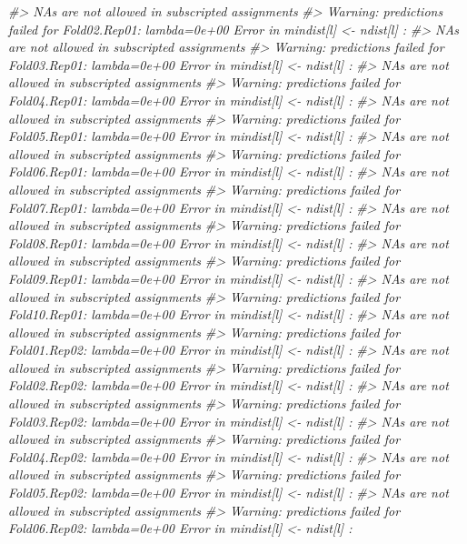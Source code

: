 \documentclass[]{book}
\newenvironment{Shaded}{\begin{snugshade}}{\end{snugshade}}
\newcommand{\CommentTok}[1]{\textcolor[rgb]{0.56,0.35,0.01}{\textit{#1}}}
\begin{document}
\begin{Shaded}
\begin{Highlighting}[]
\CommentTok{#>   NAs are not allowed in subscripted assignments}
\CommentTok{#> Warning: predictions failed for Fold02.Rep01: lambda=0e+00 Error in mindist[l] <- ndist[l] : }
\CommentTok{#>   NAs are not allowed in subscripted assignments}
\CommentTok{#> Warning: predictions failed for Fold03.Rep01: lambda=0e+00 Error in mindist[l] <- ndist[l] : }
\CommentTok{#>   NAs are not allowed in subscripted assignments}
\CommentTok{#> Warning: predictions failed for Fold04.Rep01: lambda=0e+00 Error in mindist[l] <- ndist[l] : }
\CommentTok{#>   NAs are not allowed in subscripted assignments}
\CommentTok{#> Warning: predictions failed for Fold05.Rep01: lambda=0e+00 Error in mindist[l] <- ndist[l] : }
\CommentTok{#>   NAs are not allowed in subscripted assignments}
\CommentTok{#> Warning: predictions failed for Fold06.Rep01: lambda=0e+00 Error in mindist[l] <- ndist[l] : }
\CommentTok{#>   NAs are not allowed in subscripted assignments}
\CommentTok{#> Warning: predictions failed for Fold07.Rep01: lambda=0e+00 Error in mindist[l] <- ndist[l] : }
\CommentTok{#>   NAs are not allowed in subscripted assignments}
\CommentTok{#> Warning: predictions failed for Fold08.Rep01: lambda=0e+00 Error in mindist[l] <- ndist[l] : }
\CommentTok{#>   NAs are not allowed in subscripted assignments}
\CommentTok{#> Warning: predictions failed for Fold09.Rep01: lambda=0e+00 Error in mindist[l] <- ndist[l] : }
\CommentTok{#>   NAs are not allowed in subscripted assignments}
\CommentTok{#> Warning: predictions failed for Fold10.Rep01: lambda=0e+00 Error in mindist[l] <- ndist[l] : }
\CommentTok{#>   NAs are not allowed in subscripted assignments}
\CommentTok{#> Warning: predictions failed for Fold01.Rep02: lambda=0e+00 Error in mindist[l] <- ndist[l] : }
\CommentTok{#>   NAs are not allowed in subscripted assignments}
\CommentTok{#> Warning: predictions failed for Fold02.Rep02: lambda=0e+00 Error in mindist[l] <- ndist[l] : }
\CommentTok{#>   NAs are not allowed in subscripted assignments}
\CommentTok{#> Warning: predictions failed for Fold03.Rep02: lambda=0e+00 Error in mindist[l] <- ndist[l] : }
\CommentTok{#>   NAs are not allowed in subscripted assignments}
\CommentTok{#> Warning: predictions failed for Fold04.Rep02: lambda=0e+00 Error in mindist[l] <- ndist[l] : }
\CommentTok{#>   NAs are not allowed in subscripted assignments}
\CommentTok{#> Warning: predictions failed for Fold05.Rep02: lambda=0e+00 Error in mindist[l] <- ndist[l] : }
\CommentTok{#>   NAs are not allowed in subscripted assignments}
\CommentTok{#> Warning: predictions failed for Fold06.Rep02: lambda=0e+00 Error in mindist[l] <- ndist[l] : }

\end{Highlighting}
\end{Shaded}
\end{document}
